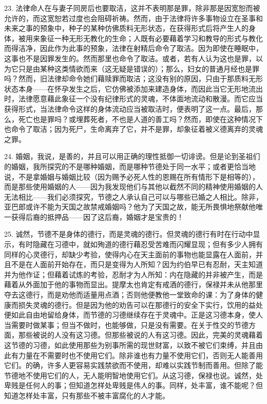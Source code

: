 23. 法律命人在与妻子同房后也要取洁，这并不表明那是罪，除非那是因宽恕而被允许的，而这宽恕若过度也会阻碍祈祷。然而，由于法律将许多事物设立在圣事和未来之事的预象中，种子的某种仿佛质料无形状态，在获得形式后将产生人的身体，被用来象征一种无形无教化的生命；人既有必要藉着学习和教导的形式与教化而得洁净，因此作为此事的预象，法律在射精后命令了取洁。因为即使在睡眠中，这事也不是因罪发生的。然而那里也命令了取洁。或者，若有人认为这也是罪，以为它只是由某种这类情欲而来（这无疑是错误的）；那么，妇女的普通月经也是罪吗？然而，旧法律却命令她们藉赎罪而取洁；这没有别的原因，只由于那质料无形状态本身——在怀孕发生之后，它仿佛被添加来建造身体，而因此当它无形地流出时，法律愿意藉此象征一个没有纪律形式的灵魂，不体面地流动和散漫。而它应当获得形式，当法律命令这样的身体流动应当被取洁时，便表明了这一点。最后，那么，死亡也是罪吗？或埋葬死者，不也是人道的善工吗？然而，即使在这种情况下也命令了取洁；因为死尸，生命离弃了它，并不是罪，却象征着被义德离弃的灵魂之罪。\par

24. 婚姻，我说，是善的，并且可以用正确的理性抵御一切诽谤。但是论到圣祖们的婚姻，我所探究的不是哪种婚姻，而是哪种节德处于同一水平；或者更恰当地说，不是拿婚姻与婚姻比较（因为赐予必死人性的恩赐在所有情形下是相等的），而是那些使用婚姻的人——因为我发现他们与其他以截然不同的精神使用婚姻的人无法相比——我们必须探究，节德之人承认自己可以与哪些已婚之人相比。除非，亚巴郎或许不能为天国之故禁戒婚姻吗？他为了天国之故，能无所畏惧地祭献他唯一获得后裔的抵押品——因了这后裔，婚姻才是宝贵的！\par

25. 诚然，节德不是身体的德行，而是灵魂的德行。但灵魂的德行有时在行动中显示，有时隐藏在习德中，就如殉道的德行藉忍受苦难而闪耀显现；但有多少人拥有同样的心灵德行，却缺少考验，使得内心在天主面前的事物也能显露在人面前，并且不是在人面前开始存在，而只是变得为人所知？因为约伯早已有忍耐，天主知道并为他作证；但藉着试炼的考验，忍耐才为人所知：内在隐藏的并非被产生，而是藉着从外面加于他的事物而显出。提摩太也肯定有戒酒的德行，保禄并未从他那里夺去这德行，而是劝他而适量用点酒；否则他便教他一堂致命的课：为了身体的健康而损失灵魂的德行。但是因为他的劝告可以在那德行的安全下实行，饮用的益处便如此自由地留给身体，而节德的习德继续存在于灵魂中。正是这习德本身，使人当需要时做某事；但当不做时，也能够做，只是没有需要。在关于性交的节德方面，那些被说的人没有这习德。但那些被说的人有这习德。因此，完美的灵魂藉着这节德的习德，如此使用那些为别事所需的现世财富，以致不被它们束缚，并且由此有力量在不需要时也不使用它们。除非谁也有力量不使用它们，否则无人能善用它们。的确，许多人更容易实践禁欲而不使用，却难以实践节制而善用。但除了能节德地不使用它们的人，无人能明智地使用它们。从这习德，保禄也说。诚然，处卑贱是任何人的事；但知道怎样处卑贱是伟人的事。同样，处丰富，谁不能呢？但知道怎样处丰富，只有那些不被丰富腐化的人才能。\par

